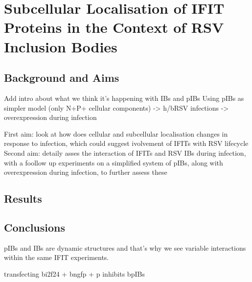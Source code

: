 \chapter{Subcellular Localisation of IFIT Proteins in the Context of RSV Inclusion Bodies} \label{ch:Subcellular Localisation of IFIT Proteins in the Context of RSV Inclusion Bodies}
\section{Background and Aims} \label{sec:Background and Aims-Chapter3}
Add intro about what we think it's happening with IBs and pIBs
Using pIBs as simpler model (only N+P+ cellular components) -> h/bRSV infections -> overexpression during infection

First aim: look at how does cellular and subcellular localisation changes in response to infection, which could suggest ivolvement of IFITs with RSV lifecycle
Second aim: detaily asses the interaction of IFITs and RSV IBs during infection, with a foollow up experiments on a simplified system of pIBs, along with overexpression during infection, to further assess these



\section{Results} \label{sec:Results-Chapter3}





\section{Conclusions} \label{sec:Conclusions-Chapter3}
pIBs and IBs are dynamic structures and that's why we see variable interactions within the same IFIT experiments.

transfecting bi2f24 + bngfp + p inhibits bpIBs